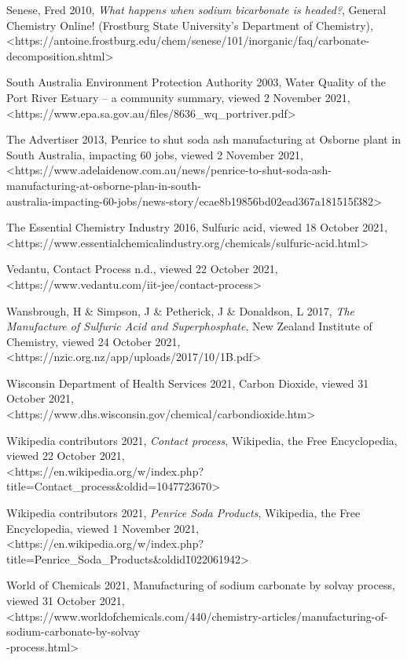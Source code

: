 \documentclass[12pt, a4paper]{article}
\begin{document}
Senese, Fred 2010, \emph{What happens when sodium bicarbonate is headed?}, General Chemistry Online! (Frostburg State University's Department of Chemistry), \\ \textless{https://antoine.frostburg.edu/chem/senese/101/inorganic/faq/carbonate-decomposition.shtml}\textgreater

South Australia Environment Protection Authority 2003, Water Quality of the Port River Estuary – a community summary, viewed 2 November 2021, \\ \textless{https://www.epa.sa.gov.au/files/8636\_wq\_portriver.pdf}\textgreater

The Advertiser 2013, Penrice to shut soda ash manufacturing at Osborne plant in South Australia, impacting 60 jobs, viewed 2 November 2021, \\ \textless{https://www.adelaidenow.com.au/news/penrice-to-shut-soda-ash-manufacturing-at-osborne-plan-in-south- \\ australia-impacting-60-jobs/news-story/ecae8b19856bd02ead367a181515f382}\textgreater

The Essential Chemistry Industry 2016, Sulfuric acid, viewed 18 October 2021, \\ \textless{https://www.essentialchemicalindustry.org/chemicals/sulfuric-acid.html}\textgreater

Vedantu, Contact Process n.d., viewed 22 October 2021, \\ \textless{https://www.vedantu.com/iit-jee/contact-process}\textgreater

Wansbrough, H \& Simpson, J \& Petherick, J \& Donaldson, L 2017, \emph{The Manufacture of Sulfuric Acid and Superphosphate}, New Zealand Institute of Chemistry, viewed 24 October 2021, \\ \textless{https://nzic.org.nz/app/uploads/2017/10/1B.pdf}\textgreater

Wisconsin Department of Health Services 2021, Carbon Dioxide, viewed 31 October 2021, \\ \textless{https://www.dhs.wisconsin.gov/chemical/carbondioxide.htm}\textgreater

Wikipedia contributors 2021, \emph{Contact process}, Wikipedia, the Free Encyclopedia, viewed 22 October 2021, \\ \textless{https://en.wikipedia.org/w/index.php?title=Contact\_process\&oldid=1047723670}\textgreater

Wikipedia contributors 2021, \emph{Penrice Soda Products}, Wikipedia, the Free Encyclopedia, viewed 1 November 2021, \\ \textless{https://en.wikipedia.org/w/index.php?title=Penrice\_Soda\_Products\&oldid\=1022061942}\textgreater

World of Chemicals 2021, Manufacturing of sodium carbonate by solvay process, viewed 31 October 2021, \\ \textless{https://www.worldofchemicals.com/440/chemistry-articles/manufacturing-of-sodium-carbonate-by-solvay \\ -process.html}\textgreater
\end{document}
